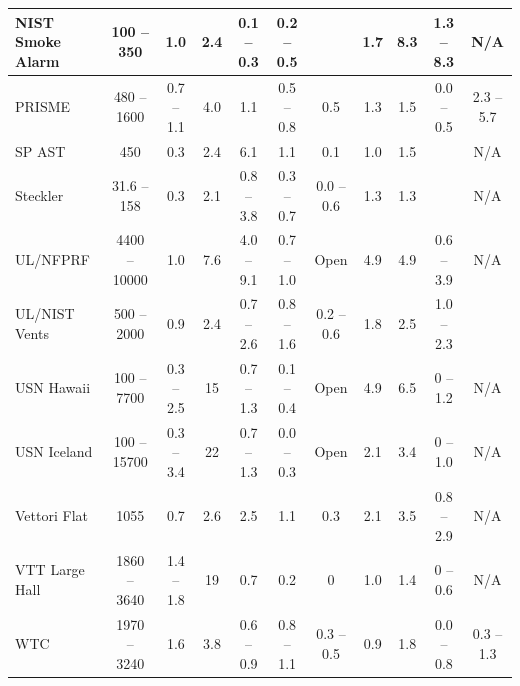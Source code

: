 \begin{landscape}
\begin{longtable}{|l|c|c|c|c|c|c|c|c|c|c|}
NIST Smoke Alarm    & 100 -- 350    & 1.0           & 2.4   & 0.1 -- 0.3        & 0.2 -- 0.5          &               & 1.7         & 8.3         & 1.3 -- 8.3             & N/A                      \\ \hline
PRISME              & 480 -- 1600   & 0.7 -- 1.1    & 4.0   & 1.1               & 0.5 -- 0.8          & 0.5           & 1.3         & 1.5         & 0.0 -- 0.5             & 2.3 -- 5.7            \\ \hline
SP AST              & 450           & 0.3           & 2.4   & 6.1               & 1.1                 & 0.1           & 1.0         & 1.5         &                        & N/A                      \\ \hline
Steckler            & 31.6 -- 158   & 0.3           & 2.1   & 0.8 -- 3.8        & 0.3 -- 0.7          & 0.0 -- 0.6    & 1.3         & 1.3         &                        &  N/A                     \\ \hline
UL/NFPRF            & 4400 -- 10000 & 1.0           & 7.6   & 4.0 -- 9.1        & 0.7 -- 1.0          & Open          & 4.9         & 4.9         & 0.6 -- 3.9             &  N/A                     \\ \hline
UL/NIST Vents       & 500 -- 2000   & 0.9           & 2.4   & 0.7 -- 2.6        & 0.8 -- 1.6          & 0.2 -- 0.6    & 1.8         & 2.5         & 1.0 -- 2.3             &                       \\ \hline
USN Hawaii          & 100 -- 7700   & 0.3 -- 2.5    & 15    & 0.7 -- 1.3        & 0.1 -- 0.4          & Open          & 4.9         & 6.5         & 0 -- 1.2               & N/A                      \\ \hline
USN Iceland         & 100 -- 15700  & 0.3 -- 3.4    & 22    & 0.7 -- 1.3        & 0.0 -- 0.3          & Open          & 2.1         & 3.4         & 0 -- 1.0               & N/A                      \\ \hline
Vettori Flat        & 1055          & 0.7           & 2.6   & 2.5               & 1.1                 & 0.3           & 2.1         & 3.5         & 0.8 -- 2.9             & N/A                      \\ \hline
VTT Large Hall      & 1860 -- 3640  & 1.4 -- 1.8    & 19    & 0.7               & 0.2                 & 0             & 1.0         & 1.4         & 0 -- 0.6               & N/A                      \\ \hline
WTC                 & 1970 -- 3240  & 1.6           & 3.8   & 0.6 -- 0.9        & 0.8 -- 1.1          & 0.3 -- 0.5    & 0.9         & 1.8         & 0.0 -- 0.8             & 0.3 -- 1.3            \\ \hline
\end{longtable}
\end{landscape}

\newpage

